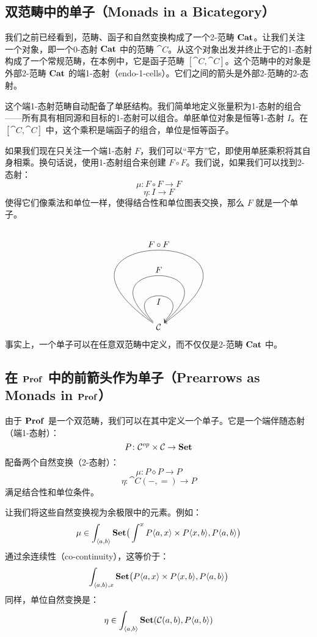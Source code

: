 \documentclass[DaoFP]{subfiles}
\begin{document}
 \subsection{双范畴中的单子（Monads in a Bicategory）}

 我们之前已经看到，范畴、函子和自然变换构成了一个2-范畴 $\mathbf{Cat}$。让我们关注一个对象，即一个0-态射 $\mathbf{Cat}$ 中的范畴 $\cat C$。从这个对象出发并终止于它的1-态射构成了一个常规范畴，在本例中，它是函子范畴 $[\cat C, \cat C]$。这个范畴中的对象是外部2-范畴 $\mathbf{Cat}$ 的端1-态射（endo-1-cells）。它们之间的箭头是外部2-范畴的2-态射。

 这个端1-态射范畴自动配备了单胚结构。我们简单地定义张量积为1-态射的组合——所有具有相同源和目标的1-态射可以组合。单胚单位对象是恒等1-态射 $I$。在 $[\cat C, \cat C]$ 中，这个乘积是端函子的组合，单位是恒等函子。

 如果我们现在只关注一个端1-态射 $F$，我们可以“平方”它，即使用单胚乘积将其自身相乘。换句话说，使用1-态射组合来创建 $F \circ F$。我们说，如果我们可以找到2-态射：
 \[ \mu \colon F \circ F \to F \]
 \[ \eta \colon I \to F \]
 使得它们像乘法和单位一样，使得结合性和单位图表交换，那么 $F$ 就是一个单子。
 \[
  \begin{tikzpicture}
   \node [] (star) {$\cat C$} ;
   \path[->,draw] (star) to  [in=45,out=135, loop,distance=2cm] node[ below] {$I$} (star);
   \path[->,draw] (star) to  [in=40,out=140, loop,distance=4cm] node[above] {$F$} (star);
   \path[->,draw] (star) to  [ in=35,out=145, loop,distance=7cm] node[auto] {$F \circ F$} (star);
  \end{tikzpicture}
 \]
 事实上，一个单子可以在任意双范畴中定义，而不仅仅是2-范畴 $\mathbf{Cat}$ 中。

 \subsection{在 $\mathbf{Prof}$ 中的前箭头作为单子（Prearrows as Monads in $\mathbf{Prof}$）}

 由于 $\mathbf{Prof}$ 是一个双范畴，我们可以在其中定义一个单子。它是一个端伴随态射（端1-态射）：
 \[ P \colon \mathcal{C}^{op} \times \mathcal{C} \to \mathbf{Set} \]
 配备两个自然变换（2-态射）：
 \[ \mu \colon P \diamond P \to P \]
 \[ \eta \colon \cat C(-, =) \to P \]
 满足结合性和单位条件。

 让我们将这些自然变换视为余极限中的元素。例如：
 \[ \mu \in \int_{\langle a, b \rangle} \mathbf{Set} \big( \int^x P \langle a, x \rangle \times P \langle x, b \rangle,  P\langle a, b \rangle \big) \]
 通过余连续性（co-continuity），这等价于：
 \[ \int_{\langle a, b \rangle, x} \mathbf{Set} \big(P \langle a, x \rangle \times P \langle x, b \rangle,  P\langle a, b \rangle \big) \]
 同样，单位自然变换是：
 \[ \eta \in \int_{\langle a, b \rangle} \mathbf{Set} (\mathcal{C}(a, b), P\langle a, b \rangle) \]
\end{document}
